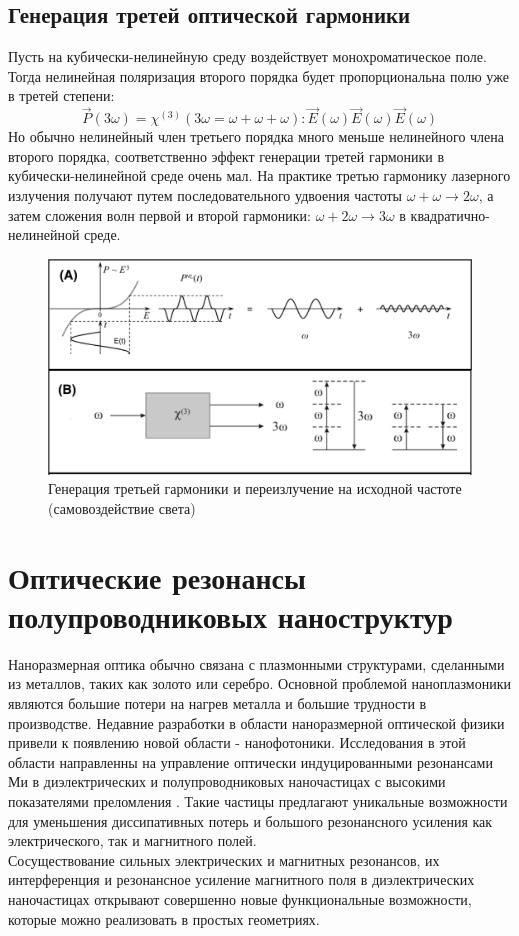 \subsection*{Генерация третей оптической гармоники} 
Пусть на кубически-нелинейную среду воздействует монохроматическое поле. Тогда нелинейная поляризация второго порядка будет пропорциональна полю уже в третей степени:
\begin{equation}\label{thg2}
\vec{P}(3\omega) = \chi^{(3)}(3\omega = \omega + \omega + \omega):\vec{E}(\omega)\vec{E} (\omega)\vec{E} (\omega)
\end{equation}
Но обычно нелинейный член третьего порядка много меньше нелинейного члена второго порядка, соответственно  эффект генерации третей гармоники в кубически-нелинейной среде очень мал. На практике третью гармонику лазерного излучения получают путем последовательного удвоения частоты $\omega +  \omega \rightarrow 2\omega$, а затем сложения волн первой и второй гармоники: $\omega +  2\omega \rightarrow 3\omega$ в квадратично-нелинейной среде.
\begin{figure}[h]
	\centering
	\includegraphics[width=0.6\linewidth]{images/thg.png}
	\caption{ Генерация третьей гармоники  и переизлучение на исходной частоте (самовоздействие света)}
	\label{thg1}
\end{figure}

\section{Оптические резонансы полупроводниковых наноструктур}
\hspace*{2mm}
Наноразмерная оптика обычно связана с плазмонными структурами, сделанными из металлов, таких как золото или серебро. Основной проблемой наноплазмоники являются большие потери на нагрев металла и большие трудности в производстве. Недавние разработки в области наноразмерной оптической физики привели к появлению новой области -  нанофотоники. Исследования в этой области направленны на управление оптически индуцированными резонансами Ми в диэлектрических и полупроводниковых наночастицах с высокими показателями преломления \cite{kuznetsov2016optically}. Такие частицы предлагают уникальные возможности для уменьшения диссипативных потерь и большого резонансного усиления как электрического, так и магнитного полей. 
\\
\hspace*{2mm}
Сосуществование сильных электрических и магнитных резонансов, их интерференция и резонансное усиление магнитного поля в диэлектрических наночастицах открывают совершенно новые функциональные возможности, которые можно реализовать в простых геометриях. 

